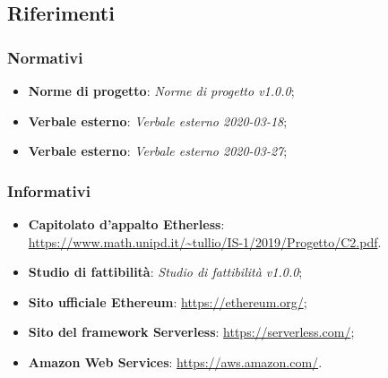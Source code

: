 \subsection{Riferimenti}
\subsubsection{Normativi}
\begin{itemize}
	\item \textbf{Norme di progetto}: \textit{Norme di progetto v1.0.0};
	\item \textbf{Verbale esterno}: \textit{Verbale esterno 2020-03-18};
	\item \textbf{Verbale esterno}: \textit{Verbale esterno 2020-03-27};
\end{itemize}

\subsubsection{Informativi}
\begin{itemize}
	\item \textbf{Capitolato d'appalto Etherless}:\\\url{https://www.math.unipd.it/~tullio/IS-1/2019/Progetto/C2.pdf}.
	\item \textbf{Studio di fattibilità}: \textit{Studio di fattibilità v1.0.0};
	\item \textbf{Sito ufficiale Ethereum}: \url{https://ethereum.org/};
	\item \textbf{Sito del framework Serverless}: \url{https://serverless.com/};
	\item \textbf{Amazon Web Services}: \url{https://aws.amazon.com/}.
\end{itemize}
